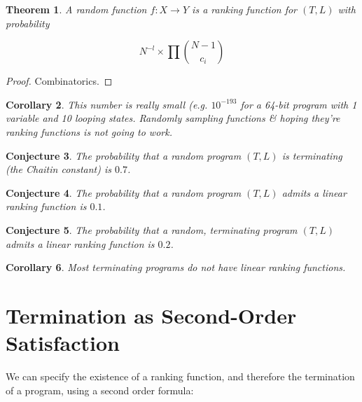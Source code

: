 \documentclass[preprint]{sigplanconf}
\newtheorem{theorem}{Theorem}
\newtheorem{corollary}[theorem]{Corollary}
\newtheorem{conjecture}[theorem]{Conjecture}
\theoremstyle{definition}
\begin{document}
\begin{theorem}
 A random function $f : X \to Y$ is a ranking function for $(T, L)$ with probability

 $$N^{-l} \times \prod {{N-1} \choose c_i}$$
\end{theorem}

\begin{proof}
 Combinatorics.
\end{proof}


\begin{corollary}
 This number is really small (e.g. $10^{-193}$ for a 64-bit program with 1 variable and 10 looping states.
 Randomly sampling functions \& hoping they're ranking functions is not going to work.
\end{corollary}


\begin{conjecture}
 The probability that a random program $(T, L)$ is terminating (the Chaitin constant)
 is $0.7$.
\end{conjecture}

\begin{conjecture}
 The probability that a random program $(T, L)$ admits a linear ranking function is
 $0.1$.
\end{conjecture}

\begin{conjecture}
 The probability that a random, terminating program $(T, L)$ admits a linear ranking function
 is $0.2$.
\end{conjecture}


\begin{corollary}
 Most terminating programs do not have linear ranking functions.
\end{corollary}


\section{Termination as Second-Order Satisfaction}
We can specify the existence of a ranking function, and therefore the termination
of a program, using a second order formula:
\end{document}
